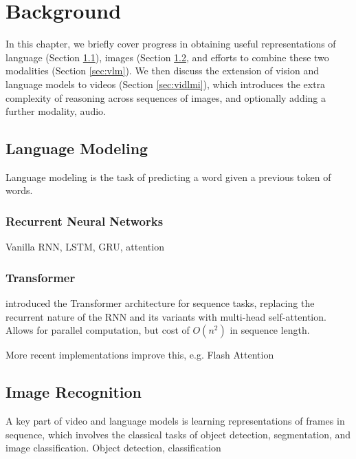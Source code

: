 
\chapter{Background}
\label{chap:bg}

In this chapter, we briefly cover progress in obtaining useful representations
of language (Section \ref{sec:lm}), images (Section \ref{sec:imrec}, and
efforts to combine these two modalities (Section \ref{sec:vlm}). We then
discuss the extension of vision and language models to videos (Section
\ref{sec:vidlmi}), which introduces the extra complexity of reasoning across
sequences of images, and optionally adding a further modality, audio. 

\section{Language Modeling}
\label{sec:lm}

Language modeling is the task of predicting a word given a previous token of words.

\subsection{Recurrent Neural Networks}
\label{ssec:rnn}

Vanilla RNN, LSTM, GRU, attention
	
\subsection{Transformer}
\label{ssec:transformer}

\cite{vaswani2017attention} introduced the Transformer architecture for sequence tasks, replacing the recurrent nature of the RNN and its variants with multi-head self-attention. Allows for parallel computation, but cost of $O(n^2)$ in sequence length.

More recent implementations improve this, e.g. Flash Attention

\section{Image Recognition}
\label{sec:imrec}

A key part of video and language models is learning representations of frames in sequence, which involves the classical tasks of object detection, segmentation, and image classification.
Object detection, classification

